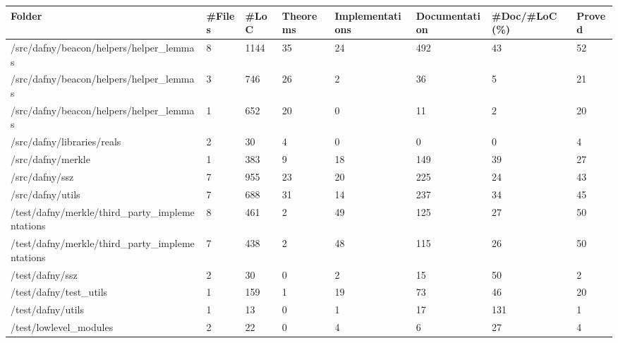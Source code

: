 \documentclass[a4paper, 12pt]{article}
\begin{document}
\vspace{2em}
\begin{tabular}{llllllll}
\toprule
                                         Folder & \#Files &  \#LoC & Theorems & Implementations & Documentation & \#Doc/\#LoC (\%) & Proved \\
\midrule
        /src/dafny/beacon/helpers/helper\_lemmas &      8 &  1144 &       35 &              24 &           492 &            43 &     52 \\
        /src/dafny/beacon/helpers/helper\_lemmas &      3 &   746 &       26 &               2 &            36 &             5 &     21 \\
        /src/dafny/beacon/helpers/helper\_lemmas &      1 &   652 &       20 &               0 &            11 &             2 &     20 \\
                     /src/dafny/libraries/reals &      2 &    30 &        4 &               0 &             0 &             0 &      4 \\
                              /src/dafny/merkle &      1 &   383 &        9 &              18 &           149 &            39 &     27 \\
                                 /src/dafny/ssz &      7 &   955 &       23 &              20 &           225 &            24 &     43 \\
                               /src/dafny/utils &      7 &   688 &       31 &              14 &           237 &            34 &     45 \\
 /test/dafny/merkle/third\_party\_implementations &      8 &   461 &        2 &              49 &           125 &            27 &     50 \\
 /test/dafny/merkle/third\_party\_implementations &      7 &   438 &        2 &              48 &           115 &            26 &     50 \\
                                /test/dafny/ssz &      2 &    30 &        0 &               2 &            15 &            50 &      2 \\
                         /test/dafny/test\_utils &      1 &   159 &        1 &              19 &            73 &            46 &     20 \\
                              /test/dafny/utils &      1 &    13 &        0 &               1 &            17 &           131 &      1 \\
                         /test/lowlevel\_modules &      2 &    22 &        0 &               4 &             6 &            27 &      4 \\
\bottomrule
\end{tabular}
\end{document}
